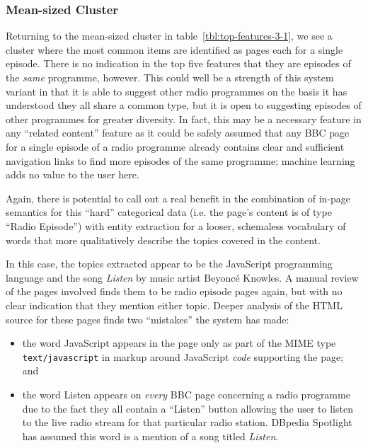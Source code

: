 \subsubsection{Mean-sized Cluster}

Returning to the mean-sized cluster in table~\ref{tbl:top-features-3-1},
we see a cluster where the most common items are identified as pages
each for a single episode. There is no indication in the top five
features that they are episodes of the \emph{same} programme, however.
This could well be a strength of this system variant in that it is
able to suggest other radio programmes on the basis it has understood
they all share a common type, but it is open to suggesting episodes
of other programmes for greater diversity. In fact, this may be a
necessary feature in any ``related content'' feature as it could
be safely assumed that any BBC page for a single episode of a radio
programme already contains clear and sufficient navigation links to
find more episodes of the same programme; machine learning adds no
value to the user here.

Again, there is potential to call out a real benefit in the
combination of in-page semantics for this ``hard'' categorical
data (i.e. the page's content is of type ``Radio Episode'') with
entity extraction for a looser, schemaless vocabulary of words that
more qualitatively describe the topics covered in the content.

In this case, the topics extracted appear to be the JavaScript
programming language and the song \emph{Listen} by music artist
Beyonc\'e Knowles. A manual review of the pages involved finds them
to be radio episode pages again, but with no clear indication that
they mention either topic. Deeper analysis of the HTML source for
these pages finds two ``mistakes'' the system has made:

\begin{itemize}
\item the word JavaScript appears in the page only as part of the
  MIME type \texttt{text/javascript} in markup around JavaScript
  \emph{code} supporting the page; and
\item the word Listen appears on \emph{every} BBC page concerning
  a radio programme due to the fact they all contain a ``Listen''
  button allowing the user to listen to the live radio stream for
  that particular radio station. DBpedia Spotlight has assumed this
  word is a mention of a song titled \emph{Listen}.
\end{itemize}

